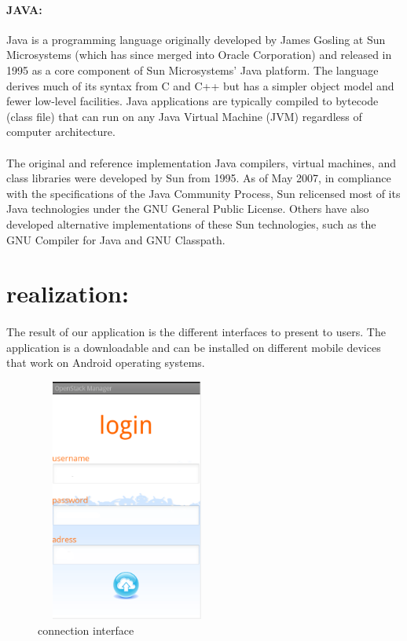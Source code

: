 \paragraph{JAVA: }Java is a programming language originally developed by James Gosling at Sun Microsystems 
(which has since merged into Oracle Corporation) and released in 1995 as a core component of Sun Microsystems' Java platform.
The language derives much of its syntax from C and C++ but has a simpler object model and fewer low-level facilities. Java applications are typically 
compiled to bytecode (class file) that can run on any Java Virtual Machine (JVM) regardless of computer architecture.\par
\paragraph{}The original and reference implementation Java compilers, virtual machines, and class libraries were developed by Sun from 1995. As of May 2007, 
in compliance with the specifications of the Java Community Process, 
Sun relicensed most of its Java technologies under the GNU General Public License. 
Others have also developed alternative implementations of these Sun technologies, such as the GNU Compiler for Java and GNU Classpath.\par
\section{realization: }
\paragraph{} The result of our application is the different interfaces to present to users.
The application is a downloadable and can be installed on different mobile devices that work
on Android operating systems.

\begin{figure}[!h]
 \center
 \includegraphics[width=6cm, height=8cm]{./images/implementation/login}
 \caption{connection interface}
\end{figure}
